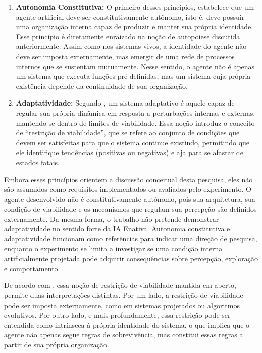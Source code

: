 \begin{enumerate}
    \item \textbf{Autonomia Constitutiva:} O primeiro desses princípios, estabelece que um agente artificial deve ser constitutivamente autônomo, isto é, deve possuir uma organização interna capaz de produzir e manter sua própria identidade. Esse princípio é diretamente enraizado na noção de autopoiese discutida anteriormente. Assim como nos sistemas vivos, a identidade do agente não deve ser imposta externamente, mas emergir de uma rede de processos internos que se sustentam mutuamente. Nesse sentido, o agente não é apenas um sistema que executa funções pré-definidas, mas um sistema cuja própria existência depende da continuidade de sua organização.

    \item \textbf{Adaptatividade:} Segundo , um sistema adaptativo é aquele capaz de regular sua própria dinâmica em resposta a perturbações internas e externas, mantendo-se dentro de limites de viabilidade. Essa noção introduz o conceito de ``restrição de viabilidade'', que se refere ao conjunto de condições que devem ser satisfeitas para que o sistema continue existindo, permitindo que ele identifique tendências (positivas ou negativas) e aja para se afastar de estados fatais.
\end{enumerate}

Embora esses princípios orientem a discussão conceitual desta pesquisa, eles não são assumidos como requisitos implementados ou avaliados pelo experimento. O agente desenvolvido não é constitutivamente autônomo, pois sua arquitetura, sua condição de viabilidade e os mecanismos que regulam sua percepção são definidos externamente. Da mesma forma, o trabalho não pretende demonstrar adaptatividade no sentido forte da IA Enativa. Autonomia constitutiva e adaptatividade funcionam como referências para indicar uma direção de pesquisa, enquanto o experimento se limita a investigar se uma condição interna artificialmente projetada pode adquirir consequências sobre percepção, exploração e comportamento.

De acordo com , essa noção de restrição de viabilidade mantida em aberto, permite duas interpretações distintas. Por um lado, a restrição de viabilidade pode ser imposta externamente, como em sistemas projetados ou algoritmos evolutivos. Por outro lado, e mais profundamente, essa restrição pode ser entendida como intrínseca à própria identidade do sistema, o que implica que o agente não apenas segue regras de sobrevivência, mas constitui essas regras a partir de sua própria organização.

